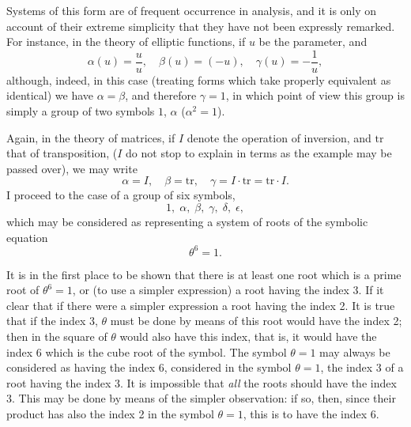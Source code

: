 \documentclass[11pt,a4paper]{book}
\begin{document}
Systems of this form are of frequent occurrence in analysis, and it is only on
account of their extreme simplicity that they have not been expressly remarked. For
instance, in the theory of elliptic functions, if $u$ be the parameter, and
\[
\alpha(u) = \frac{u}{u},\quad\beta(u) = (-u),\quad\gamma(u) = -\frac{1}{u},
\]
although, indeed, in this case (treating forms which take properly equivalent as identical)
we have $\alpha = \beta$, and therefore $\gamma = 1$, in which point of view this group is simply a
group of two symbols $1$, $\alpha$ ($\alpha^2=1$).

\medskip

Again, in the theory of matrices, if $I$ denote the operation of inversion, and $\mathrm{tr}$
that of transposition, ($I$ do not stop to explain in terms as the example may be
passed over), we may write
\[
\alpha = I,\quad\beta = \mathrm{tr},\quad\gamma = I\cdot\mathrm{tr} = \mathrm{tr}\cdot I.
\]
I proceed to the case of a group of six symbols,
\[
1,\;\alpha,\;\beta,\;\gamma,\;\delta,\;\epsilon,
\]
which may be considered as representing a system of roots of the symbolic equation
\[
\theta^6 = 1.
\]

\medskip

It is in the first place to be shown that there is at least one root which is a
prime root of $\theta^6=1$, or (to use a simpler expression) a root having the index 3. If
it clear that if there were a simpler expression a root having the index 2. It
is true that if the index 3, $\theta$ must be done by means
of this root would have the index 2; then in the square of $\theta$ would also have
this index, that is, it would have the index 6 which is the cube root of the symbol.
The symbol $\theta = 1$ may always be considered as having the index 6, considered
in the symbol $\theta = 1$, the index 3 of a root having the index 3. It
is impossible that \textit{all} the roots should have the index 3. This may be done by means
of the simpler observation: if so, then, since their product has also the index 2 in
the symbol $\theta = 1$, this is to have the index 6.

\medskip
\end{document}
